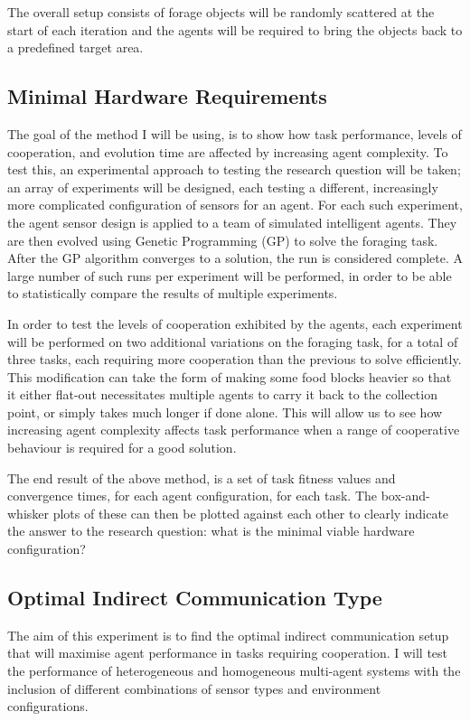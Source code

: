 \documentclass[a4paper,12pt]{article}
\begin{document}
The overall setup consists of forage objects will be randomly scattered at the start of each iteration and the agents will be required to bring the objects back to a predefined target area.

\subsection{Minimal Hardware Requirements}
The goal of the method I will be using, is to show how task performance, levels of cooperation, and evolution time are affected by increasing agent complexity. To test this, an experimental approach to testing the research question will be taken; an array of experiments will be designed, each testing a different, increasingly more complicated configuration of sensors for an agent. For each such experiment, the agent sensor design is applied to a team of simulated intelligent agents. They are then evolved using Genetic Programming (GP)\cite{Koza90} to solve the foraging task. After the GP algorithm converges to a solution, the run is considered complete. A large number of such runs per experiment will be performed, in order to be able to statistically compare the results of multiple experiments.

In order to test the levels of cooperation exhibited by the agents, each experiment will be performed on two additional variations on the foraging task, for a total of three tasks, each requiring more cooperation than the previous to solve efficiently. This modification can take the form of making some food blocks heavier so that it either flat-out necessitates multiple agents to carry it back to the collection point, or simply takes much longer if done alone.
This will allow us to see how increasing agent complexity affects task performance when a range of cooperative behaviour is required for a good solution.

The end result of the above method, is a set of task fitness values and convergence times, for each agent configuration, for each task. The box-and-whisker plots of these can then be plotted against each other to clearly indicate the answer to the research question: what is the minimal viable hardware configuration?

\subsection{Optimal Indirect Communication Type}

The aim of this experiment is to find the optimal indirect communication setup that will maximise agent performance in tasks requiring cooperation. I will test the performance of heterogeneous and homogeneous multi-agent systems with the inclusion of different combinations of sensor types and environment configurations.
\end{document}
